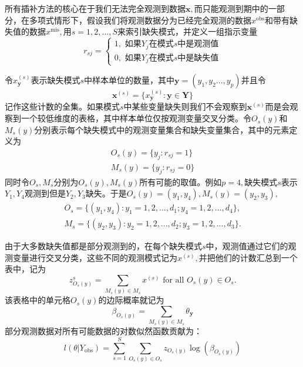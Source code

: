 \documentclass[12pt,hyperref,a4paper,UTF8]{ctexart}
\begin{document}
所有插补方法的核心在于我们无法完全观测到数据$\boldsymbol{x},$而只能观测到期中的一部分，在多项式情形下，假设我们将观测数据分为已经完全观测的数据$x^\text{obs}$和带有缺失值的数据$x^\text{mis},$用$s=1,2,...,S$来索引缺失模式，并定义一组指示变量
\begin{equation*}
    r_{sj}=\begin{cases}
        1,\text{ 如果$Y_j$在模式$s$中是观测值}\\
        0,\text{ 如果$Y_j$在模式$s$中是缺失值}
    \end{cases}
\end{equation*}

令$x_{\boldsymbol{y}}^{(s)}$表示缺失模式$s$中样本单位的数量，其中$\boldsymbol{y}=(y_1,y_2...,y_p)$并且令
\begin{equation*}
    \boldsymbol{x}^{(s)}=\{x_{\boldsymbol{y}}^{(s)}:\boldsymbol{y}\in\boldsymbol{Y}\}
\end{equation*}
记作这些计数的全集。如果模式$s$中某些变量缺失则我们不会观察到$\boldsymbol{x}^{(s)}$而是会观察到一个较低维度的表格，其中样本单位仅按观测变量交叉分类。令$O_s(y)$和$M_s(y)$分别表示每个缺失模式中的观测变量集合和缺失变量集合，其中的元素定义为
\begin{align*}
    O_s(y)=\{y_j:r_{sj}=1\}\\
    M_s(y)=\{y_j: r_{sj}=0\}
\end{align*}
同时令$O_s,M_s$分别为$O_s(y),M_s(y)$所有可能的取值。例如$p=4,$缺失模式$s$表示$Y_1,Y_4$观测到但是$Y_2,Y_3$缺失。于是$O_s(y)=(y_1,y_4),M_s(y)=(y_2,y_3),$
\begin{align*}
    O_s=\{(y_1,y_4):y_1=1,2,...,d_1;y_4=1,2,...,d_4\},\\
    M_s=\{(y_2,y_3):y_2=1,2,...,d_2;y_3=1,2,...,d_3\}.
\end{align*}

由于大多数缺失值都是部分观测到的，在每个缺失模式$s$中，观测值通过它们的观测变量进行交叉分类，这些不同的观测模式记为$x^{(s)},$并把他们的计数汇总到一个表中，记为
\begin{equation*}
    z^s_{O_s(y)}=\sum_{M_s(y)\in M_s}x^{(s)}\text{ for all } O_s(y)\in O_s.
\end{equation*}
该表格中的单元格$O_s(y)$的边际概率就记为
\begin{equation*}
    \beta_{O_s(y)}=\sum_{M_s(y)\in M_s}\theta_{\boldsymbol{y}}
\end{equation*}
部分观测数据对所有可能数据的对数似然函数贡献为：
\begin{equation*}
    l(\theta|Y_{\text{obs}})=\sum_{s=1}^S\sum_{O_s(y)\in O_s}z_{O_s(y)}\log (\beta_{O_s(y)})
\end{equation*}
\end{document}
